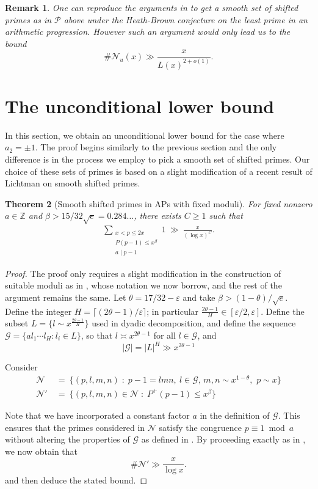 \documentclass[12pt,a4paper,oneside]{amsart}
\newtheorem{theorem}{Theorem}[section]
\newtheorem{remark}[theorem]{Remark}
\begin{document}
\begin{remark}
    One can reproduce the arguments in \cite[\S 5]{Wr20} to get a smooth set of shifted primes as in $\mathcal{P}$ above under the Heath-Brown conjecture on the least prime in an arithmetic progression. However such an argument would only lead us to the bound \[\#\mathcal{N}_u(x)\gg \frac{x}{L(x)^{2+o(1)}}.\] 
\end{remark}





\section{The unconditional lower bound}
In this section, we obtain an unconditional lower bound for the case where $a_2=\pm 1$. The proof begins similarly to the previous section and the only difference is in the process  we employ  to pick a  smooth set of shifted primes. Our choice of these sets of primes is based on a slight modification of a recent result of Lichtman on smooth shifted primes.
\begin{theorem}[Smooth shifted primes in APs with fixed moduli]\label{thm:shftdprime}
For fixed nonzero $a\in\mathbb{Z}$ and $\beta > 15/32\sqrt{e}= 0.284\ldots$, there exists $C\ge1$ such that
\begin{align}
\sum_{\substack{x<p\le 2x\\P(p-1) \le x^\beta \\ a\mid p-1}}1 \ \gg \ \frac{x}{(\log x)^C}.
\end{align}
\end{theorem}
\begin{proof}
The proof only requires a slight modification in the construction of suitable moduli as in  \cite[\S 3]{Li22}, whose notation we now borrow, and the rest of the argument remains the same.
Let $\theta=17/32-\varepsilon$ and take $\beta>(1-\theta)/\sqrt{e}$. Define the integer $H = \lceil (2\theta-1)/\varepsilon\rceil$; in particular $\frac{2\theta-1}{H}\in[\varepsilon/2,\varepsilon]$. Define the subset $L = \{l\sim x^{\frac{2\theta-1}{H}}\}$ used in dyadic decomposition, and define the sequence $\mathcal G = \{al_1\cdots l_H : l_i\in L\}$, so that $l\asymp x^{2\theta-1}$ for all $l\in \mathcal G$, and
\[
|\mathcal G|  = |L|^H \gg x^{2\theta-1}
\]

Consider
\begin{align*}
\mathcal N \ & = \ \big\{(p,l,m,n) \;:\; p-1 = lmn, \ l\in\mathcal G, \, m,n\sim x^{1-\theta},\,\, p\sim x \big\}\\
\mathcal N' \ & = \ \big\{(p,l,m,n)\in \mathcal N \;:\; P^+(p-1) \le x^\beta \big\}
\end{align*}

Note that we have incorporated a constant factor $a$ in the definition of $\mathcal{G}$. This ensures that the primes considered in $\mathcal{N}$ satisfy the congruence $p\equiv 1\bmod{a}$ without altering the properties of $\mathcal{G}$ as defined in \cite[\S 3]{Li22}.
By proceeding exactly as in \cite[\S 3]{Li22}, we now obtain that
\[\label{eq:N1bound}
\#\mathcal N' \gg \frac{x}{\log x}.
\]
and then deduce the stated bound. \end{proof}
\end{document}
